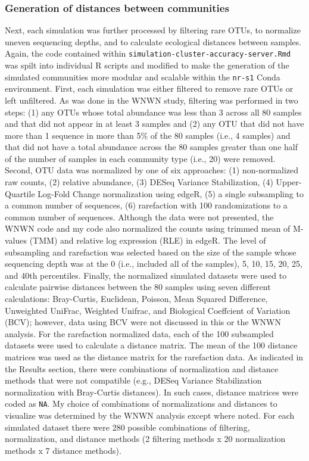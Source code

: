 \documentclass[
]{article}
\begin{document}
\hypertarget{generation-of-distances-between-communities}{%
\subsubsection{Generation of distances between
communities}\label{generation-of-distances-between-communities}}

Next, each simulation was further processed by filtering rare OTUs, to
normalize uneven sequencing depths, and to calculate ecological
distances between samples. Again, the code contained within
\texttt{simulation-cluster-accuracy-server.Rmd} was spilt into
individual R scripts and modified to make the generation of the
simulated communities more modular and scalable within the
\texttt{nr-s1} Conda environment. First, each simulation was either
filtered to remove rare OTUs or left unfiltered. As was done in the WNWN
study, filtering was performed in two steps: (1) any OTUs whose total
abundance was less than 3 across all 80 samples and that did not appear
in at least 3 samples and (2) any OTU that did not have more than 1
sequence in more than 5\% of the 80 samples (i.e., 4 samples) and that
did not have a total abundance across the 80 samples greater than one
half of the number of samples in each community type (i.e., 20) were
removed. Second, OTU data was normalized by one of six approaches: (1)
non-normalized raw counts, (2) relative abundance, (3) DESeq Variance
Stabilization, (4) Upper-Quartile Log-Fold Change normalization using
edgeR, (5) a single subsampling to a common number of sequences, (6)
rarefaction with 100 randomizations to a common number of sequences.
Although the data were not presented, the WNWN code and my code also
normalized the counts using trimmed mean of M-values (TMM) and relative
log expression (RLE) in edgeR. The level of subsampling and rarefaction
was selected based on the size of the sample whose sequencing depth was
at the 0 (i.e., included all of the samples), 5, 10, 15, 20, 25, and
40th percentiles. Finally, the normalized simulated datasets were used
to calculate pairwise distances between the 80 samples using seven
different calculations: Bray-Curtis, Euclidean, Poisson, Mean Squared
Difference, Unweighted UniFrac, Weighted Unifrac, and Biological
Coeffcient of Variation (BCV); however, data using BCV were not
discussed in this or the WNWN analysis. For the rarefaction normalized
data, each of the 100 subsampled datasets were used to calculate a
distance matrix. The mean of the 100 distance matrices was used as the
distance matrix for the rarefaction data. As indicated in the Results
section, there were combinations of normalization and distance methods
that were not compatible (e.g., DESeq Variance Stabilization
normalization with Bray-Curtis distances). In such cases, distance
matrices were coded as \texttt{NA}. My choice of combinations of
normalizations and distances to visualize was determined by the WNWN
analysis except where noted. For each simulated dataset there were 280
possible combinations of filtering, normalization, and distance methods
(2 filtering methods x 20 normalization methods x 7 distance methods).
\end{document}
